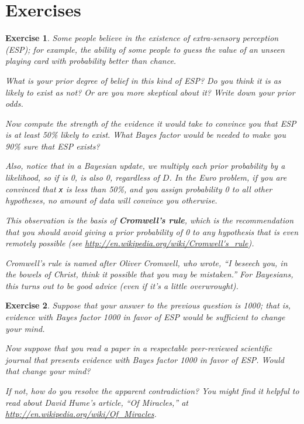 \documentclass[12pt]{book}
\theoremstyle{exercise}
\newtheorem{exercise}{Exercise}[chapter]
\newcommand{\py}[1]{{\tt #1}}%
\begin{document}
\section{Exercises}


\begin{exercise}
Some people believe in the existence of extra-sensory
perception (ESP); for example, the ability of some people to guess
the value of an unseen playing card with probability better
than chance.

What is your prior degree of belief in this kind of ESP?
Do you think it is as likely to exist as not?  Or are you
more skeptical about it?  Write down your prior odds.

Now compute the strength of the evidence it would take to
convince you that ESP is at least 50\% likely to exist.
What Bayes factor would be needed to make you 90\% sure
that ESP exists?

Also, notice that in a Bayesian update, we multiply
each prior probability by a likelihood, so if  is 0,
 is also 0, regardless of $D$.  In the Euro problem,
if you are convinced that \py{x} is less than 50\%, and you assign
probability 0 to all other hypotheses, no amount of data will
convince you otherwise.

This observation is the basis of {\bf Cromwell's rule}, which is the
recommendation that you should avoid giving a prior probability of
0 to any hypothesis that is even remotely possible
(see \url{http://en.wikipedia.org/wiki/Cromwell's_rule}).

Cromwell's rule is named after Oliver Cromwell, who wrote, ``I beseech
you, in the bowels of Christ, think it possible that you may be
mistaken.''  For Bayesians, this turns out to be good advice (even if
it's a little overwrought).
\end{exercise}


\begin{exercise}
Suppose that your answer to the previous question is 1000;
that is, evidence with Bayes factor 1000 in favor of ESP would
be sufficient to change your mind.

Now suppose that you read a paper in a respectable peer-reviewed
scientific journal that presents evidence with Bayes factor 1000 in
favor of ESP.  Would that change your mind?

If not, how do you resolve the apparent contradiction?
You might find it helpful to read about David Hume's article, ``Of
Miracles,'' at \url{http://en.wikipedia.org/wiki/Of_Miracles}.

\end{exercise}
\end{document}

